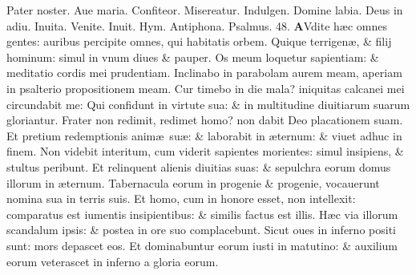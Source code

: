 \documentclass[a5paper,10pt]{book}
\def\ae{æ}
\begin{document}
\begin{multicols*}{2}
\vspace{-1em}
\par \noindent \color{red} P\color{black}ater noster. Aue maria. Confiteor. Misereatur. Indulgen. Domine labia. Deus in adiu. \color{red} Inuita. \color{black} Venite. \color{red} Inuit. Hym. Antiphona. \quad Psalmus. 48. \color{black}
\lettrine[lines=2]{\bfseries \color{red} A}{}Vdite h\ae c omnes gentes: auribus percipite omnes, qui habitatis orbem.
\newline \color{red} Q\color{black}uique terrigen\ae , \& filij hominum: simul in vnum diues \& pauper.
\newline \color{red} O\color{black}s meum loquetur sapientiam: \& meditatio cordis mei prudentiam.
\newline \color{red} I\color{black}nclinabo in parabolam aurem meam, aperiam in psalterio propositionem meam.
\newline \color{red} C\color{black}ur timebo in die mala? iniquitas calcanei mei circundabit me:
\newline \color{red} Q\color{black}ui confidunt in virtute sua: \& in multitudine diuitiarum suarum gloriantur.
\newline \color{red} F\color{black}rater non redimit, redimet homo? non dabit Deo placationem suam.
\newline \color{red} E\color{black}t pretium redemptionis anim\ae \ su\ae : \& laborabit in \ae ternum: \& viuet adhuc in finem.
\newline \color{red} N\color{black}on videbit interitum, cum viderit sapientes morientes: simul insipiens, \& stultus peribunt.
\newline \color{red} E\color{black}t relinquent alienis diuitias suas: \& sepulchra eorum domus illorum in \ae ternum.
\newline \color{red} T\color{black}abernacula eorum in progenie \& progenie, vocauerunt nomina sua in terris suis.
\newline \color{red} E\color{black}t homo, cum in honore esset, non intellexit: comparatus est iumentis insipientibus: \& similis factus est illis.
\newline \color{red} H\color{black}\ae c via illorum scandalum ipsis: \& postea in ore suo complacebunt.
\newline \color{red} S\color{black}icut oues in inferno positi sunt: mors depascet eos.
\newline \color{red} E\color{black}t dominabuntur eorum iusti in matutino: \& auxilium eorum veterascet in inferno a gloria eorum.

\end{multicols*}
\end{document}
